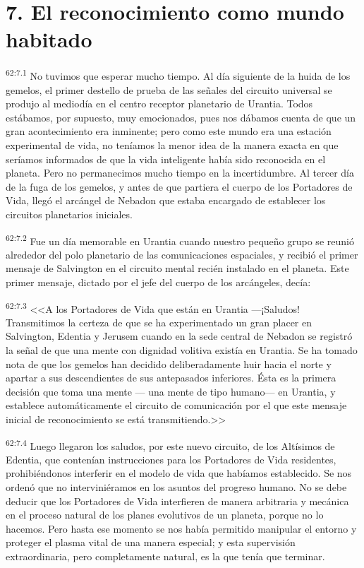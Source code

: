 \section*{7. El reconocimiento como mundo habitado}
\par
\textsuperscript{62:7.1} No tuvimos que esperar mucho tiempo. Al día siguiente de la huida de los gemelos, el primer destello de prueba de las señales del circuito universal se produjo al mediodía en el centro receptor planetario de Urantia. Todos estábamos, por supuesto, muy emocionados, pues nos dábamos cuenta de que un gran acontecimiento era inminente; pero como este mundo era una estación experimental de vida, no teníamos la menor idea de la manera exacta en que seríamos informados de que la vida inteligente había sido reconocida en el planeta. Pero no permanecimos mucho tiempo en la incertidumbre. Al tercer día de la fuga de los gemelos, y antes de que partiera el cuerpo de los Portadores de Vida, llegó el arcángel de Nebadon que estaba encargado de establecer los circuitos planetarios iniciales.

\par
\textsuperscript{62:7.2} Fue un día memorable en Urantia cuando nuestro pequeño grupo se reunió alrededor del polo planetario de las comunicaciones espaciales, y recibió el primer mensaje de Salvington en el circuito mental recién instalado en el planeta. Este primer mensaje, dictado por el jefe del cuerpo de los arcángeles, decía:

\par
\textsuperscript{62:7.3} <<A los Portadores de Vida que están en Urantia ---¡Saludos! Transmitimos la certeza de que se ha experimentado un gran placer en Salvington, Edentia y Jerusem cuando en la sede central de Nebadon se registró la señal de que una mente con dignidad volitiva existía en Urantia. Se ha tomado nota de que los gemelos han decidido deliberadamente huir hacia el norte y apartar a sus descendientes de sus antepasados inferiores. Ésta es la primera decisión que toma una mente --- una mente de tipo humano--- en Urantia, y establece automáticamente el circuito de comunicación por el que este mensaje inicial de reconocimiento se está transmitiendo.>>

\par
\textsuperscript{62:7.4} Luego llegaron los saludos, por este nuevo circuito, de los Altísimos de Edentia, que contenían instrucciones para los Portadores de Vida residentes, prohibiéndonos interferir en el modelo de vida que habíamos establecido. Se nos ordenó que no interviniéramos en los asuntos del progreso humano. No se debe deducir que los Portadores de Vida interfieren de manera arbitraria y mecánica en el proceso natural de los planes evolutivos de un planeta, porque no lo hacemos. Pero hasta ese momento se nos había permitido manipular el entorno y proteger el plasma vital de una manera especial; y esta supervisión extraordinaria, pero completamente natural, es la que tenía que terminar.

